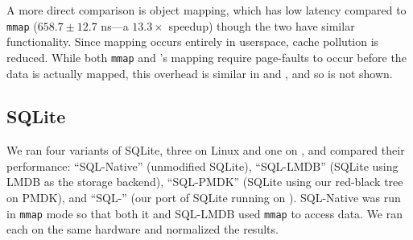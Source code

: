 {    %
    A more direct comparison is object mapping, which has
    low latency compared to \texttt{mmap} ($658.7 \pm 12.7$ ns---a $13.3\times$ speedup) though the two have similar
    functionality. Since mapping occurs entirely
    in userspace, cache pollution is reduced.
    While both \texttt{mmap} and \Twizzler's mapping require
    page-faults to occur before the data is actually mapped,
    this overhead is similar in \Twizzler and \unix, and so is not
    shown.




    \subsection{SQLite}

    We ran four variants of SQLite, three on Linux and one on \Twizzler, and compared their performance: ``SQL-Native'' (unmodified SQLite),
    ``SQL-LMDB'' (SQLite using LMDB as the storage backend), ``SQL-PMDK'' (SQLite using
    our red-black tree on PMDK),
    and ``SQL-\Twizzler'' (our port of SQLite running on \Twizzler). SQL-Native was run in \texttt{mmap} mode so that both it
    and SQL-LMDB used \texttt{mmap} to access data.
    We ran each on the same hardware and normalized the results.

}
